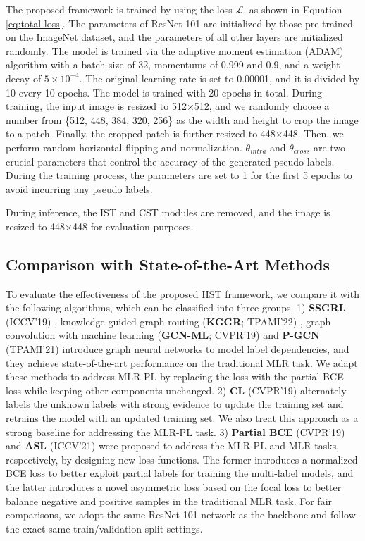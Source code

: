 The proposed framework is trained by using the loss $\mathcal{L}$, as shown in Equation \ref{eq:total-loss}. The parameters of ResNet-101 are initialized by those pre-trained on the ImageNet \cite{deng2009imagenet} dataset, and the parameters of all other layers are initialized randomly. The model is trained via the adaptive moment estimation (ADAM) algorithm \cite{kingma2015adam} with a batch size of 32, momentums of 0.999 and 0.9, and a weight decay of $5 \times 10^{-4}$. The original learning rate is set to 0.00001, and it is divided by 10 every 10 epochs. The model is trained with 20 epochs in total. During training, the input image is resized to 512$\times$512, and we randomly choose a number from \{512, 448, 384, 320, 256\} as the width and height to crop the image to a patch. Finally, the cropped patch is further resized to 448$\times$448. Then, we perform random horizontal flipping and normalization. $\theta_{intra}$ and $\theta_{cross}$ are two crucial parameters that control the accuracy of the generated pseudo labels. During the training process, the parameters are set to 1 for the first 5 epochs to avoid incurring any pseudo labels.

During inference, the IST and CST modules are removed, and the image is resized to 448$\times$448 for evaluation purposes.

\subsection{Comparison with State-of-the-Art Methods}
To evaluate the effectiveness of the proposed HST framework, we compare it with the following algorithms, which can be classified into three groups. 1) \textbf{SSGRL} (ICCV'19) \cite{chen2019learning}, knowledge-guided graph routing (\textbf{KGGR}; TPAMI'22) \cite{chen2022knowledge}, graph convolution with machine learning (\textbf{GCN-ML}; CVPR'19) \cite{chen2019multi} and \textbf{P-GCN} (TPAMI'21) \cite{chen2021p-gcn} introduce graph neural networks to model label dependencies, and they achieve state-of-the-art performance on the traditional MLR task. We adapt these methods to address MLR-PL by replacing the loss with the partial BCE loss while keeping other components unchanged. 2) \textbf{CL} (CVPR'19) \cite{durand2019learning} alternately labels the unknown labels with strong evidence to update the training set and retrains the model with an updated training set. We also treat this approach as a strong baseline for addressing the MLR-PL task. 3) \textbf{Partial BCE} (CVPR'19) \cite{durand2019learning} and \textbf{ASL} (ICCV'21) \cite{ridnik2021asymmetric} were proposed to address the MLR-PL and MLR tasks, respectively, by designing new loss functions. The former introduces a normalized BCE loss to better exploit partial labels for training the multi-label models, and the latter introduces a novel asymmetric loss based on the focal loss \cite{lin2017focal-loss} to better balance negative and positive samples in the traditional MLR task. For fair comparisons, we adopt the same ResNet-101 network as the backbone and follow the exact same train/validation split settings.

